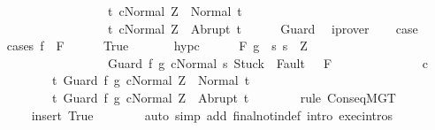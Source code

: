 \begin{isabellebody}
\ \ \ \ \ \ \ \ \ \ \ \ \ \ \ \ \ \ \ \ {\isacharbraceleft}t{\isachardot}\ {\isasymGamma}{\isasymturnstile}{\isasymlangle}c{\isacharcomma}Normal\ Z{\isasymrangle}\ {\isasymRightarrow}\ Normal\ t{\isacharbraceright}{\isacharcomma}\isanewline
\ \ \ \ \ \ \ \ \ \ \ \ \ \ \ \ \ \ \ \ {\isacharbraceleft}t{\isachardot}\ {\isasymGamma}{\isasymturnstile}{\isasymlangle}c{\isacharcomma}Normal\ Z{\isasymrangle}\ {\isasymRightarrow}\ Abrupt\ t{\isacharbraceright}{\isachardoublequoteclose}\isanewline
\ \ \ \ \isamarkupfalse%
\ Guard\ \isamarkupfalse%
\ iprover\isanewline
\ \ \isamarkupfalse%
\ {\isacharquery}case\isanewline
\ \ \isamarkupfalse%
\ {\isacharparenleft}cases\ {\isachardoublequoteopen}f\ {\isasymin}\ F{\isachardoublequoteclose}{\isacharparenright}\isanewline
\ \ \ \ \isamarkupfalse%
\ True\ \isanewline
\ \ \ \ \isamarkupfalse%
\ hyp{\isacharunderscore}c\isanewline
\ \ \ \ \isamarkupfalse%
\ {\isachardoublequoteopen}{\isasymGamma}{\isacharcomma}{\isasymTheta}{\isasymturnstile}\isactrlbsub {\isacharslash}F\ \isactrlesub {\isacharparenleft}g\ {\isasyminter}\ {\isacharbraceleft}s{\isachardot}\ s\ {\isacharequal}\ Z\ {\isasymand}\ \isanewline
\ \ \ \ \ \ \ \ \ \ \ \ \ \ \ \ \ \ \ \ {\isasymGamma}{\isasymturnstile}{\isasymlangle}Guard\ f\ g\ c{\isacharcomma}Normal\ s{\isasymrangle}\ {\isasymRightarrow}{\isasymnotin}{\isacharparenleft}{\isacharbraceleft}Stuck{\isacharbraceright}\ {\isasymunion}\ Fault\ {\isacharbackquote}\ {\isacharparenleft}{\isacharminus}\ F{\isacharparenright}{\isacharparenright}{\isacharbraceright}{\isacharparenright}\ \isanewline
\ \ \ \ \ \ \ \ \ \ \ \ \ c\isanewline
\ \ \ \ \ \ \ \ \ \ \ {\isacharbraceleft}t{\isachardot}\ {\isasymGamma}{\isasymturnstile}{\isasymlangle}Guard\ f\ g\ c{\isacharcomma}Normal\ Z{\isasymrangle}\ {\isasymRightarrow}\ Normal\ t{\isacharbraceright}{\isacharcomma}\isanewline
\ \ \ \ \ \ \ \ \ \ \ {\isacharbraceleft}t{\isachardot}\ {\isasymGamma}{\isasymturnstile}{\isasymlangle}Guard\ f\ g\ c{\isacharcomma}Normal\ Z{\isasymrangle}\ {\isasymRightarrow}\ Abrupt\ t{\isacharbraceright}{\isachardoublequoteclose}\isanewline
\ \ \ \ \ \ \isamarkupfalse%
\ {\isacharparenleft}rule\ ConseqMGT{\isacharparenright}\isanewline
\ \ \ \ \ \ \isamarkupfalse%
\ {\isacharparenleft}insert\ True{\isacharparenright}\isanewline
\ \ \ \ \ \ \isamarkupfalse%
\ {\isacharparenleft}auto\ simp\ add{\isacharcolon}\ final{\isacharunderscore}notin{\isacharunderscore}def\ intro{\isacharcolon}\ exec{\isachardot}intros{\isacharparenright}\isanewline

\end{isabellebody}
